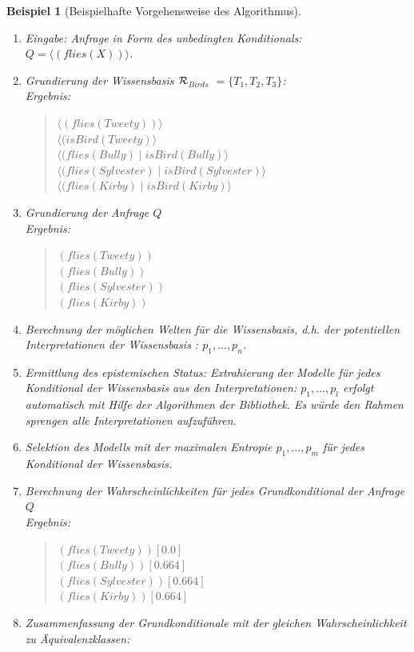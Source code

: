 \documentclass[a4paper, 11pt]{book}
\newtheorem{Bsp}{Beispiel}[section]
\begin{document}
{\begin{Bsp}[Beispielhafte Vorgehensweise des Algorithmus]
	\begin{enumerate}
		\item Eingabe: Anfrage in Form des unbedingten Konditionals:\\
		$ Q = \langle (flies(X)) \rangle $.
		\item Grundierung der Wissensbasis $ \cal  R$$_{Birds}  $ $ = \{T_1, T_2, T_3\} $:\\
		Ergebnis:
		\begin{quote}
			$\langle (flies(Tweety))\rangle $\\
			$ \langle (isBird(Tweety) \rangle$ \\
			$  \langle (flies(Bully) \mid isBird(Bully) \rangle$ \\ 
			$\langle (flies(Sylvester) \mid isBird(Sylvester) \rangle$\\
			$ \langle (flies(Kirby) \mid isBird(Kirby) \rangle $\\
		\end{quote}
		
		\item Grundierung der Anfrage $ Q $\\
		Ergebnis:
		\begin{quote}
			$ (flies(Tweety))$\\
			$ (flies(Bully))$\\
			$ (flies(Sylvester))$\\
			$ (flies(Kirby))$\\
		\end{quote}
		\item Berechnung der möglichen Welten für die Wissensbasis, d.h. der potentiellen Interpretationen der Wissensbasis : $ p_1, ..., p_n $.
		\item Ermittlung des epistemischen Status: Extrahierung der Modelle für jedes Konditional der Wissensbasis aus den Interpretationen: $ p_1, ..., p_l $ erfolgt automatisch mit Hilfe der Algorithmen der Bibliothek. Es würde den Rahmen sprengen alle Interpretationen aufzuführen.\\
		\item Selektion des Modells mit der maximalen Entropie $p_1, ..., p_m$ für jedes Konditional der Wissensbasis.
		\item Berechnung der Wahrscheinlichkeiten für jedes Grundkonditional der Anfrage $ Q $\\
		Ergebnis:
		\begin{quote}
			$(flies(Tweety))[0.0]$\\
			$(flies(Bully))[0.664]$\\
			$(flies(Sylvester))[0.664]$\\
			$(flies(Kirby))[0.664]$
		\end{quote}
		\item Zusammenfassung der Grundkonditionale mit der gleichen Wahrscheinlichkeit zu Äquivalenzklassen:
		

\end{enumerate}
\end{Bsp}}
\end{document}
